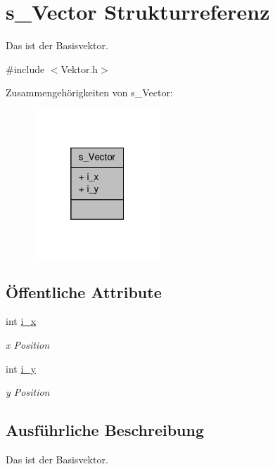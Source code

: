 \hypertarget{structs___vector}{\section{s\-\_\-\-Vector Strukturreferenz}
\label{structs___vector}
}


Das ist der Basisvektor.  




{\ttfamily \#include $<$Vektor.\-h$>$}



Zusammengehörigkeiten von s\-\_\-\-Vector\-:\nopagebreak
\begin{figure}[H]
\begin{center}
\leavevmode
\includegraphics[width=136pt]{structs___vector__coll__graph}
\end{center}
\end{figure}
\subsection*{Öffentliche Attribute}
\begin{DoxyCompactItemize}
\item 
int \hyperlink{structs___vector_a530003f44afc98b7ce7e51f77ef8f291}{i\-\_\-x}
\begin{DoxyCompactList}\small\item\em x Position \end{DoxyCompactList}\item 
int \hyperlink{structs___vector_a13bd27672ca23d2302f5c24359f67ed2}{i\-\_\-y}
\begin{DoxyCompactList}\small\item\em y Position \end{DoxyCompactList}\end{DoxyCompactItemize}


\subsection{Ausführliche Beschreibung}
Das ist der Basisvektor. 

